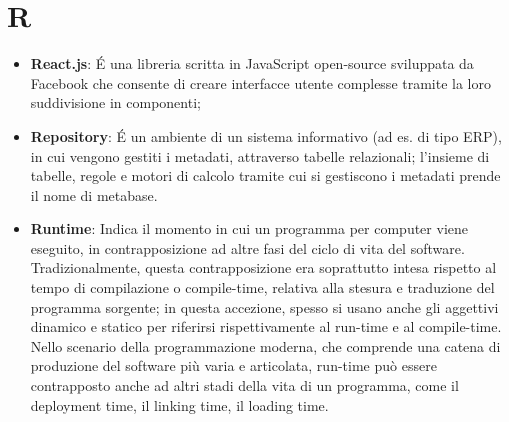 \section{R}
\begin{itemize}
\item
\textbf{React.js}: É una libreria scritta in JavaScript open-source sviluppata da Facebook che consente di creare interfacce utente complesse tramite la loro suddivisione in componenti;
\item
\textbf{Repository}: É un ambiente di un sistema informativo (ad es. di tipo ERP), in cui vengono gestiti i metadati, attraverso tabelle relazionali; l'insieme di tabelle, regole e motori di calcolo tramite cui si gestiscono i metadati prende il nome di metabase. 
\item
\textbf{Runtime}: Indica il momento in cui un programma per computer viene eseguito, in contrapposizione ad altre fasi del ciclo di vita del software.
Tradizionalmente, questa contrapposizione era soprattutto intesa rispetto al tempo di compilazione o compile-time, relativa alla stesura e traduzione del programma sorgente; in questa accezione, spesso si usano anche gli aggettivi dinamico e statico per riferirsi rispettivamente al run-time e al compile-time. Nello scenario della programmazione moderna, che comprende una catena di produzione del software più varia e articolata, run-time può essere contrapposto anche ad altri stadi della vita di un programma, come il deployment time, il linking time, il loading time.
\end{itemize}